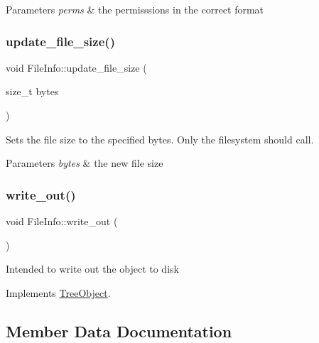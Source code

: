 \begin{DoxyParams}{Parameters}
{\em perms} & the permisssions in the correct format \\
\hline
\end{DoxyParams}
\mbox{\label{class_file_info_a3c548a8dfcb6530bfef7551ac24ca473}} 
\subsubsection{\texorpdfstring{update\+\_\+file\+\_\+size()}{update\_file\_size()}}
{\footnotesize\ttfamily void File\+Info\+::update\+\_\+file\+\_\+size (\begin{DoxyParamCaption}\item[{size\+\_\+t}]{bytes }\end{DoxyParamCaption})}

Sets the file size to the specified bytes. Only the filesystem should call. 
\begin{DoxyParams}{Parameters}
{\em bytes} & the new file size \\
\hline
\end{DoxyParams}
\mbox{\label{class_file_info_a8e835f000ddfd0f1097ccfa7e7801a09}} 
\subsubsection{\texorpdfstring{write\+\_\+out()}{write\_out()}}
{\footnotesize\ttfamily void File\+Info\+::write\+\_\+out (\begin{DoxyParamCaption}{ }\end{DoxyParamCaption})\hspace{0.3cm}{\ttfamily [virtual]}}

Intended to write out the object to disk 

Implements \mbox{\hyperlink{class_tree_object_a63708d61353d83e3e03597394bb7aca0}{Tree\+Object}}.



\subsection{Member Data Documentation}
\mbox{\label{class_file_info_ad074cd1ea6b131fe01d7bd18a9da7230}} 
